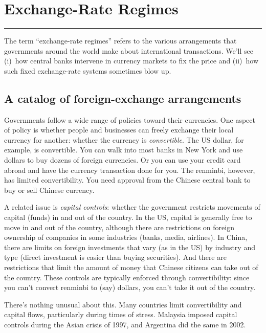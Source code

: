 \chapter{Exchange-Rate Regimes}\label{chp:fxr}
\hypertarget{fxregimes}{}


\rule{\textwidth}{1pt}

The term ``exchange-rate regimes'' refers to the various
arrangements that governments around the world make about
international transactions.
We'll see (i)~how central banks intervene
in currency markets to fix the price
and (ii)~how such fixed exchange-rate systems sometimes blow up.


\section{A catalog of foreign-exchange arrangements }

Governments follow a wide range of policies toward their currencies.
One aspect of policy is whether people and businesses can freely
exchange their local currency for another:
whether the currency is {\it convertible\/}.
The US dollar, for example, is convertible.
You can walk into most banks in New York and use dollars to buy dozens of foreign currencies.
Or you can use your credit card abroad and have the currency transaction
done for you.
The renminbi, however, has limited convertibility.
You need approval from the Chinese central bank  to buy or sell Chinese currency.

A related issue is {\it capital controls\/}: 
whether the government restricts movements of capital (funds)
in and out of the country.
In the US, capital is generally free to move in and out of the country,
although there are restrictions on foreign ownership of companies
in some industries (banks, media, airlines).
In China, there are limits on foreign investments that vary (as in the US)
by industry and type (direct investment is easier than buying securities).
And there are restrictions that limit the amount of money that Chinese citizens can take out of the country.
These controls are typically enforced through convertibility:
since you can't convert renminbi to (say) dollars, you can't
take it out of the country.


There's nothing unusual about this.
Many countries limit convertibility and capital flows,
particularly during times of stress.
Malaysia imposed capital controls during the Asian crisis of 1997,
and Argentina did the same in 2002.

